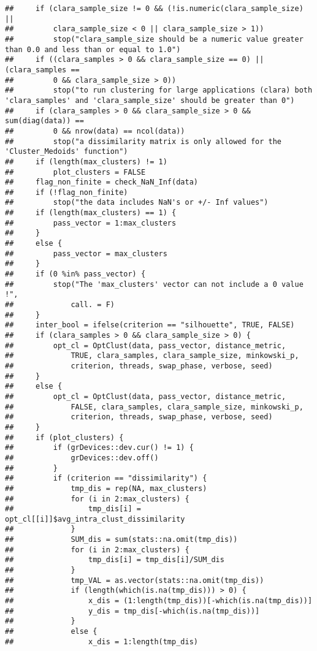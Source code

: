 \documentclass[
]{article}
\begin{document}
\begin{verbatim}
##     if (clara_sample_size != 0 && (!is.numeric(clara_sample_size) || 
##         clara_sample_size < 0 || clara_sample_size > 1)) 
##         stop("clara_sample_size should be a numeric value greater than 0.0 and less than or equal to 1.0")
##     if ((clara_samples > 0 && clara_sample_size == 0) || (clara_samples == 
##         0 && clara_sample_size > 0)) 
##         stop("to run clustering for large applications (clara) both 'clara_samples' and 'clara_sample_size' should be greater than 0")
##     if (clara_samples > 0 && clara_sample_size > 0 && sum(diag(data)) == 
##         0 && nrow(data) == ncol(data)) 
##         stop("a dissimilarity matrix is only allowed for the 'Cluster_Medoids' function")
##     if (length(max_clusters) != 1) 
##         plot_clusters = FALSE
##     flag_non_finite = check_NaN_Inf(data)
##     if (!flag_non_finite) 
##         stop("the data includes NaN's or +/- Inf values")
##     if (length(max_clusters) == 1) {
##         pass_vector = 1:max_clusters
##     }
##     else {
##         pass_vector = max_clusters
##     }
##     if (0 %in% pass_vector) {
##         stop("The 'max_clusters' vector can not include a 0 value !", 
##             call. = F)
##     }
##     inter_bool = ifelse(criterion == "silhouette", TRUE, FALSE)
##     if (clara_samples > 0 && clara_sample_size > 0) {
##         opt_cl = OptClust(data, pass_vector, distance_metric, 
##             TRUE, clara_samples, clara_sample_size, minkowski_p, 
##             criterion, threads, swap_phase, verbose, seed)
##     }
##     else {
##         opt_cl = OptClust(data, pass_vector, distance_metric, 
##             FALSE, clara_samples, clara_sample_size, minkowski_p, 
##             criterion, threads, swap_phase, verbose, seed)
##     }
##     if (plot_clusters) {
##         if (grDevices::dev.cur() != 1) {
##             grDevices::dev.off()
##         }
##         if (criterion == "dissimilarity") {
##             tmp_dis = rep(NA, max_clusters)
##             for (i in 2:max_clusters) {
##                 tmp_dis[i] = opt_cl[[i]]$avg_intra_clust_dissimilarity
##             }
##             SUM_dis = sum(stats::na.omit(tmp_dis))
##             for (i in 2:max_clusters) {
##                 tmp_dis[i] = tmp_dis[i]/SUM_dis
##             }
##             tmp_VAL = as.vector(stats::na.omit(tmp_dis))
##             if (length(which(is.na(tmp_dis))) > 0) {
##                 x_dis = (1:length(tmp_dis))[-which(is.na(tmp_dis))]
##                 y_dis = tmp_dis[-which(is.na(tmp_dis))]
##             }
##             else {
##                 x_dis = 1:length(tmp_dis)

\end{verbatim}
\end{document}
